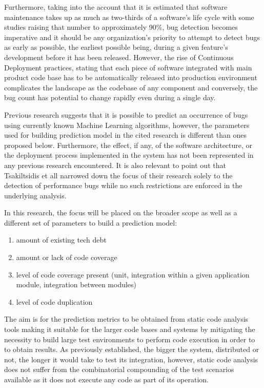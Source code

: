 Furthermore, taking into the account that it is estimated that software maintenance takes up as much as two-thirds of a software's life cycle\cite{duplicateBugDetection} with some studies raising that number to approximately 90\%\cite{reopenedBugsAndMaintenence}, bug detection becomes imperative and it should be any organization's priority to attempt to detect bugs as early as possible, the earliest possible being, during a given feature's development before it has been released. However, the rise of Continuous Deployment practices, stating that each piece of software integrated with main product code base has to be automatically released into production environment complicates the landscape as the codebase of any component and conversely, the bug count has potential to change rapidly even during a single day.

Previous research suggests that it is possible to predict an occurrence of bugs using currently known Machine Learning algorithms\cite{autoDetectionOfPerfBugs}, however, the parameters used for building prediction model in the cited research is different than ones proposed below. Furthermore, the effect, if any, of the software architecture, or the deployment process implemented in the system has not been represented in any previous research encountered. It is also relevant to point out that Tsakiltsidis et all\cite{autoDetectionOfPerfBugs} narrowed down the focus of their research solely to the detection of performance bugs while no such restrictions are enforced in the underlying analysis.

In this research, the focus will be placed on the broader scope as well as a different set of parameters to build a prediction model: 
\begin{enumerate}
\item amount of existing tech debt
\item amount or lack of code coverage
\item level of code coverage present (unit, integration within a given application module, integration between modules)
\item level of code duplication
\end{enumerate}
The aim is for the prediction metrics to be obtained from static code analysis tools making it suitable for the larger code bases and systems by mitigating the necessity to build large test environments to perform code execution in order to to obtain results. As previously established, the bigger the system, distributed or not, the longer it would take to test its integration, however, static code analysis does not suffer from the combinatorial compounding of the test scenarios available as it does not execute any code as part of its operation.

